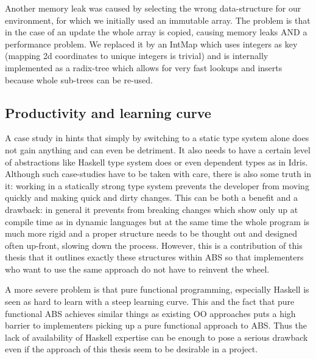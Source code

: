 Another memory leak was caused by selecting the wrong data-structure for our environment, for which we initially used an immutable array. The problem is that in the case of an update the whole array is copied, causing memory leaks AND a performance problem. We replaced it by an IntMap which uses integers as key (mapping 2d coordinates to unique integers is trivial) and is internally implemented as a radix-tree which allows for very fast lookups and inserts because whole sub-trees can be re-used.


\subsection{Productivity and learning curve}
A case study in \cite{hanenberg_experiment_2010} hints that simply by switching to a static type system alone does not gain anything and can even be detriment. It also needs to have a certain level of abstractions like Haskell type system does or even dependent types as in Idris. Although such case-studies have to be taken with care, there is also some truth in it: working in a statically strong type system prevents the developer from moving quickly and making quick and dirty changes. This can be both a benefit and a drawback: in general it prevents from breaking changes which show only up at compile time as in dynamic languages but at the same time the whole program is much more rigid and a proper structure needs to be thought out and designed often up-front, slowing down the process. However, this is a contribution of this thesis that it outlines exactly these structures within ABS so that implementers who want to use the same approach do not have to reinvent the wheel.

A more severe problem is that pure functional programming, especially Haskell is seen as hard to learn with a steep learning curve. This and the fact that pure functional ABS achieves similar things as existing OO approaches puts a high barrier to implementers picking up a pure functional approach to ABS. Thus the lack of availability of Haskell expertise can be enough to pose a serious drawback even if the approach of this thesis seem to be desirable in a project.

